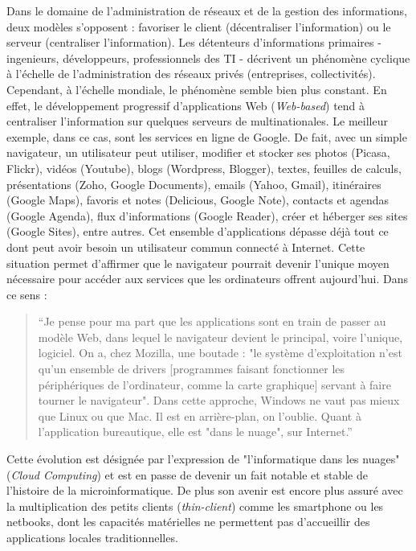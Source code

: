Dans le domaine de l'administration de réseaux et de la gestion des informations, deux modèles s'opposent : favoriser le client (décentraliser l'information) ou le serveur (centraliser l'information). Les détenteurs d'informations primaires - ingenieurs, développeurs, professionnels des TI - décrivent un phénomène cyclique à l'échelle de l'administration des réseaux privés (entreprises, collectivités). Cependant, à l'échelle mondiale, le phénomène semble bien plus constant. En effet, le développement progressif d'applications Web (\emph{Web-based}) tend à centraliser l'information sur quelques serveurs de multinationales. Le meilleur exemple, dans ce cas, sont les services en ligne de Google. De fait, avec un simple navigateur, un utilisateur peut utiliser, modifier et stocker ses photos (Picasa, Flickr), vidéos (Youtube), blogs (Wordpress, Blogger), textes, feuilles de calculs, présentations (Zoho, Google Documents), emails (Yahoo, Gmail), itinéraires (Google Maps), favoris et notes (Delicious, Google Note), contacts et agendas (Google Agenda), flux d'informations (Google Reader), créer et héberger ses sites (Google Sites), entre autres. Cet ensemble d'applications dépasse déjà tout ce dont peut avoir besoin un utilisateur commun connecté à Internet. Cette situation permet d'affirmer que le navigateur pourrait devenir l'unique moyen nécessaire pour accéder aux services que les ordinateurs offrent aujourd'hui. Dans ce sens :
\begin{quote}
“Je pense pour ma part que les applications sont en train de passer au modèle Web, dans lequel le navigateur devient le principal, voire l'unique, logiciel. On a, chez Mozilla, une boutade : "le système d'exploitation n'est qu'un ensemble de drivers [programmes faisant fonctionner les périphériques de l'ordinateur, comme la carte graphique] servant à faire tourner le navigateur". Dans cette approche, Windows ne vaut pas mieux que Linux ou que Mac. Il est en arrière-plan, on l'oublie. Quant à l'application bureautique, elle est "dans le nuage", sur Internet.” \citep{Nitot2008}
\end{quote}
Cette évolution est désignée par l'expression de "l'informatique dans les nuages" (\emph{Cloud Computing}) et est en passe de devenir un fait notable et stable de l'histoire de la microinformatique. De plus son avenir est encore plus assuré avec la multiplication des petits clients (\emph{thin-client}) comme les smartphone ou les netbooks, dont les capacités matérielles ne permettent pas d'accueillir des applications locales traditionnelles.

